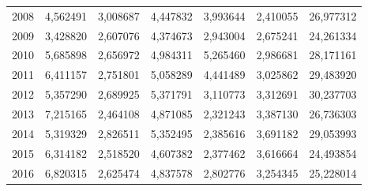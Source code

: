 \begin{table}
\begin{tabular}{p{1cm}p{2cm}p{2cm}p{2cm}p{2cm}p{2cm}p{2cm}}
 2008 &                               4,562491 &                                    3,008687 &                                  4,447832 &                                3,993644 &                     2,410055 &           26,977312 \\
 2009 &                               3,428820 &                                    2,607076 &                                  4,374673 &                                2,943004 &                     2,675241 &           24,261334 \\
 2010 &                               5,685898 &                                    2,656972 &                                  4,984311 &                                5,265460 &                     2,986681 &           28,171161 \\
 2011 &                               6,411157 &                                    2,751801 &                                  5,058289 &                                4,441489 &                     3,025862 &           29,483920 \\
 2012 &                               5,357290 &                                    2,689925 &                                  5,371791 &                                3,110773 &                     3,312691 &           30,237703 \\
 2013 &                               7,215165 &                                    2,464108 &                                  4,871085 &                                2,321243 &                     3,387130 &           26,736303 \\
 2014 &                               5,319329 &                                    2,826511 &                                  5,352495 &                                2,385616 &                     3,691182 &           29,053993 \\
 2015 &                               6,314182 &                                    2,518520 &                                  4,607382 &                                2,377462 &                     3,616664 &           24,493854 \\
 2016 &                               6,820315 &                                    2,625474 &                                  4,837578 &                                2,802776 &                     3,254345 &           25,228014 \\
\bottomrule
\end{tabular}
\end{table}
